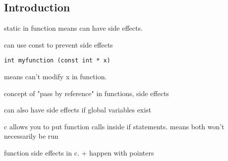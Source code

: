 
\subsection{Introduction}

static in function means can have side effects.

can use const to prevent side effects

\begin{verbatim}
int myfunction (const int * x)
\end{verbatim}

means can't modify x in function.

concept of "pass by reference" in functions, side effects

can also have side effects if global variables exist

c allows you to put function calls inside if statements. means both won't necessarily be run

function side effects in c.
+ happen with pointers

